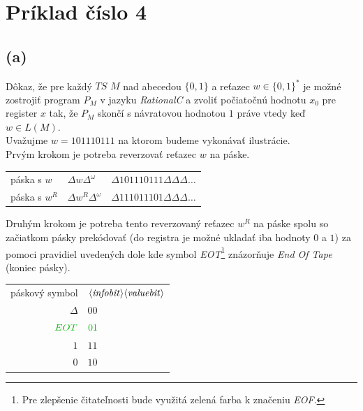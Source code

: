 \documentclass[11pt,a4paper]{article}
\newcommand{\green}[1]{\textcolor{OliveGreen}{#1}}
\begin{document}
\newpage
\section{Príklad číslo 4} %

\subsection{(a)}
Dôkaz, že pre každý $TS$ $M$ nad abecedou $\{0,1\}$ a reťazec $w \in \{0,1\}^*$ je možné zostrojiť program $P_M$ v jazyku \textit{RationalC} a zvoliť počiatočnú hodnotu $x_0$ pre register $x$ tak, že $P_M$ skončí s návratovou hodnotou $1$ práve vtedy keď $w \in L(M)$.\\

Uvažujme $w = 1 0 1 1 1 0 1 1 1$ na ktorom budeme vykonávať ilustrácie.\\

Prvým krokom je potreba reverzovať reťazec $w$ na páske.

\begin{center}
    \begin{tabular}{l|l|l}
        páska s $w$   & $\Delta w   \Delta^\omega$ & $\Delta 1 0 1 1 1 0 1 1 1 \Delta \Delta \Delta \dots$\\
        páska s $w^R$ & $\Delta w^R \Delta^\omega$ & $\Delta 1 1 1 0 1 1 1 0 1 \Delta \Delta \Delta \dots$\\
    \end{tabular}
\end{center}

Druhým krokom je potreba tento reverzovaný reťazec $w^R$ na páske spolu so začiatkom pásky prekódovať (do registra je možné ukladať iba hodnoty $0$ a $1$) za pomoci pravidiel uvedených dole kde symbol \green{\textit{EOT}}\footnote{Pre zlepšenie čitateľnosti bude využitá zelená farba k značeniu \textit{EOF}.} znázorňuje \textit{End Of Tape} (koniec pásky).

\begin{center}
    \begin{tabular}{r@{ $\rightarrow$ }l}
        páskový symbol & $\langle \text{\textit{infobit}} \rangle \langle \text{\textit{valuebit}} \rangle$\\
        $\Delta$ & $00$\\
        $\green{EOT}$ & $\green{01}$\\
        $1$ & $11$\\
        $0$ & $10$\\
    \end{tabular}
\end{center}
\end{document}
